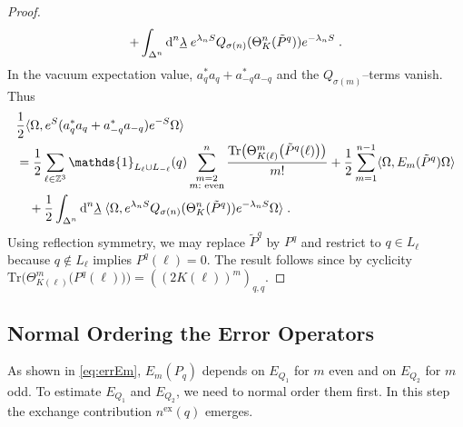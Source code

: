 \documentclass[12pt,a4paper]{article}
\numberwithin{equation}{section}
\newcommand{\1}{\mathbb{I}}
\newcommand{\di}{\textnormal{d}}
\newcommand{\ex}{\mathrm{ex}}
\newcommand{\Zstar}{\mathbb{Z}^3} %
\newcommand{\Z}{\mathbb{Z}}
\newcommand{\half}{\frac{1}{2}}
\theoremstyle{plain}
\theoremstyle{definition}
\theoremstyle{remark}
\theoremstyle{plain}
\theoremstyle{definition}
\theoremstyle{remark}
\begin{document}
\begin{proof}
\begin{align}
		+\int_{\Delta^n} \di^n \underline{\lambda} \;
		e^{\lambda_n S}Q_{\sigma(n)}(\Theta^n_K (\tilde{P}^q)) e^{-\lambda_n S} \;.	\label{eq:operatorexpansion}
\end{align}
In the vacuum expectation value, $ a_q^* a_q + a_{-q}^* a_{-q} $ and the $ Q_{\sigma(m)} $--terms vanish. Thus
\begin{align}
	& \half \langle \Omega, e^{S} (a_q^* a_q + a_{-q}^* a_{-q}) e^{-S} \Omega \rangle \nonumber\\
	&= \half \sum_{\ell\in \Zstar} \mathds{1}_{L_\ell \cup L_{-\ell}}(q) \sum_{\substack{m=2\\m:\textnormal{ even}}}^n \frac{\mathrm{Tr} \big(\Theta^m_{K(\ell)} \big( \tilde{P}^q(\ell) \big) \big)}{m!}
	+ \half \sum_{m=1}^{n-1} \langle \Omega, E_m(\tilde{P}^q) \Omega \rangle \nonumber\\
	&\quad + \half \int_{\Delta^n} \di^n \underline{\lambda} \;
		\langle \Omega, e^{\lambda_n S}Q_{\sigma(n)}(\Theta^n_{K}(\tilde{P}^q)) e^{-\lambda_n S} \Omega \rangle \;.
\end{align}
Using reflection symmetry, we may replace $ \tilde{P}^q $ by $ P^q $ and restrict to $ q \in L_\ell $ because $ q \notin L_\ell$ implies $P^q(\ell) = 0 $. The result follows since by cyclicity $ \mathrm{Tr} \big(\Theta^m_{K(\ell)} \big( P^q(\ell) \big) \big) = ((2K(\ell))^m)_{q,q} $.
\end{proof}






\subsection{Normal Ordering the Error Operators}
\label{sec:extraction_ex}
As shown in \eqref{eq:errEm}, $E_m(P_q)$ depends on $E_{Q_1}$ for $m$ even and on $E_{Q_2}$ for $m$ odd. To estimate $ E_{Q_1} $ and $ E_{Q_2} $, we need to normal order them first. In this step the exchange contribution $ n^{\ex}(q) $ emerges.
\end{document}
